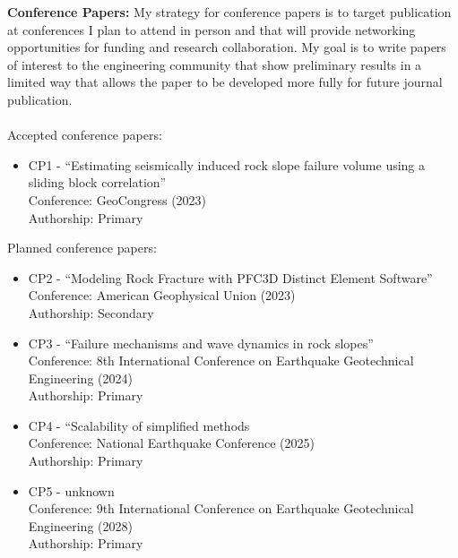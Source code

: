 \documentclass[10pt,letterpaper]{article}
\begin{document}
\noindent \textbf{Conference Papers:} My strategy for conference papers is to target publication at conferences I plan to attend in person and that will provide networking opportunities for funding and research collaboration.
My goal is to write papers of interest to the engineering community that show preliminary results in a limited way that allows the paper to be developed more fully for future journal publication.
\\
\\
\noindent Accepted conference papers:
\begin{itemize}
\item CP1 - ``Estimating seismically induced rock slope failure volume using a sliding block correlation''
\\Conference: GeoCongress (2023)
\\ Authorship: Primary 
\end{itemize}

\noindent Planned conference papers:
\begin{itemize}
\item CP2 - ``Modeling Rock Fracture with PFC3D Distinct Element Software''
\\Conference: American Geophysical Union (2023)
\\ Authorship: Secondary
\item CP3 - ``Failure mechanisms and wave dynamics in rock slopes''
\\ Conference: 8th International Conference on Earthquake Geotechnical Engineering (2024)
\\ Authorship: Primary
\item CP4 - ``Scalability of simplified methods
\\ Conference: National Earthquake Conference (2025)
\\ Authorship: Primary
\item CP5 - unknown
\\ Conference: 9th International Conference on Earthquake Geotechnical Engineering (2028)
\\ Authorship: Primary
\end{itemize}

\end{document}
